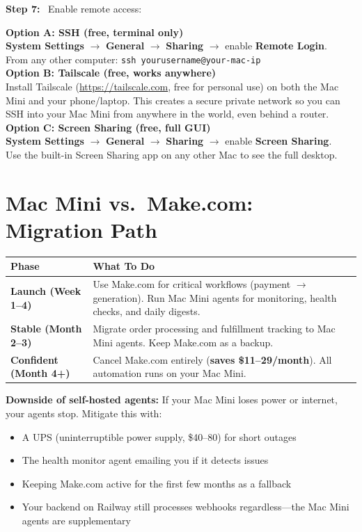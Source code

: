 \documentclass[12pt, letterpaper, oneside]{book}
\newcommand{\step}[1]{\noindent\textbf{\textcolor{primary}{Step #1:}}~}
\begin{document}
\step{7} Enable remote access:
\begin{actionbox}
\textbf{Option A: SSH (free, terminal only)}\\
\textbf{System Settings} $\rightarrow$ \textbf{General} $\rightarrow$ \textbf{Sharing} $\rightarrow$ enable \textbf{Remote Login}.\\
From any other computer: \texttt{ssh yourusername@your-mac-ip}\\[4pt]
\textbf{Option B: Tailscale (free, works anywhere)}\\
Install Tailscale (\url{https://tailscale.com}, free for personal use) on both the Mac Mini and your phone/laptop. This creates a secure private network so you can SSH into your Mac Mini from anywhere in the world, even behind a router.\\[4pt]
\textbf{Option C: Screen Sharing (free, full GUI)}\\
\textbf{System Settings} $\rightarrow$ \textbf{General} $\rightarrow$ \textbf{Sharing} $\rightarrow$ enable \textbf{Screen Sharing}.\\
Use the built-in Screen Sharing app on any other Mac to see the full desktop.
\end{actionbox}

\section{Mac Mini vs.\ Make.com: Migration Path}

\begin{table}[H]
\centering
\begin{tabularx}{\textwidth}{lX}
\toprule
\textbf{Phase} & \textbf{What To Do} \\
\midrule
\textbf{Launch (Week 1--4)} & Use Make.com for critical workflows (payment $\rightarrow$ generation). Run Mac Mini agents for monitoring, health checks, and daily digests. \\
\textbf{Stable (Month 2--3)} & Migrate order processing and fulfillment tracking to Mac Mini agents. Keep Make.com as a backup. \\
\textbf{Confident (Month 4+)} & Cancel Make.com entirely (\textbf{saves \$11--29/month}). All automation runs on your Mac Mini. \\
\bottomrule
\end{tabularx}
\end{table}

\begin{warningbox}
\textbf{Downside of self-hosted agents:} If your Mac Mini loses power or internet, your agents stop. Mitigate this with:
\begin{itemize}[leftmargin=1.5em]
  \item A UPS (uninterruptible power supply, \$40--80) for short outages
  \item The health monitor agent emailing you if it detects issues
  \item Keeping Make.com active for the first few months as a fallback
  \item Your backend on Railway still processes webhooks regardless---the Mac Mini agents are supplementary
\end{itemize}
\end{warningbox}
\end{document}
